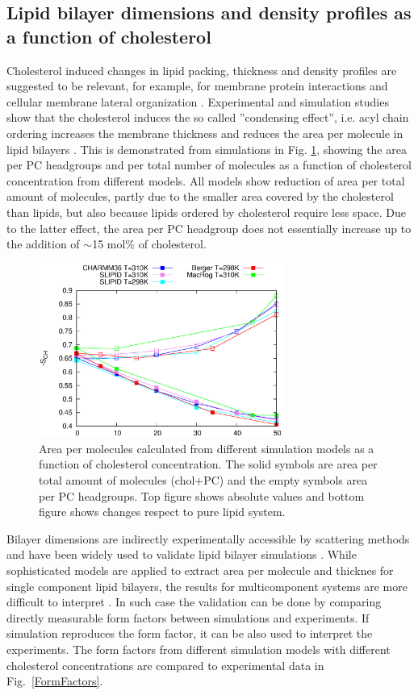\documentclass[aps,prl,superscriptaddress,twocolumn]{revtex4}
\begin{document}
\subsection{Lipid bilayer dimensions and density profiles as a function of cholesterol}
Cholesterol induced changes in lipid packing, thickness and density profiles are suggested
to be relevant, for example, for membrane protein interactions and cellular membrane
lateral organization \cite{??}. Experimental and simulation studies show that
the cholesterol induces the so called ''condensing effect'', i.e. acyl chain ordering
increases the membrane thickness and
reduces the area per molecule in lipid bilayers \cite{??}. This is demonstrated
from simulations in Fig. \ref{apls}, showing the area per PC headgroups and per
total number of molecules as a function of cholesterol concentration from different
models. All models show reduction of area per total amount of molecules, partly
due to the smaller area covered by the cholesterol than lipids, but also because
lipids ordered by cholesterol require less space. Due to the latter effect,
the area per PC headgroup does not essentially increase up to the addition of
$\sim$15 mol\% of cholesterol. \\
\begin{figure}[]
  \centering
  \includegraphics[width=8cm]{../FIGS/apls.eps}
  \caption{\label{apls}
    Area per molecules calculated from different simulation models
    as a function of cholesterol concentration. The solid symbols are area per
    total amount of molecules (chol+PC) and the empty symbols area per PC headgroups.
    Top figure shows absolute values and bottom figure shows changes respect
    to pure lipid system.
  }
\end{figure}

Bilayer dimensions are indirectly experimentally accessible by scattering methods 
and have been widely used to validate lipid bilayer simulations \cite{ollila16,??}. 
While sophisticated models are applied to extract area per molecule and thicknes for single
component lipid bilayers, the results for multicomponent systems are more difficult to interpret \cite{pan12,Heftberger15,Marquardt15,??}.
In such case the validation can be done by comparing directly measurable form factors between
simulations and experiments. If simulation reproduces the form factor, it can be also
used to interpret the experiments.  The form factors from different simulation models with
different cholesterol concentrations are compared to experimental data in Fig.~\ref{FormFactors}. \\
\end{document}
